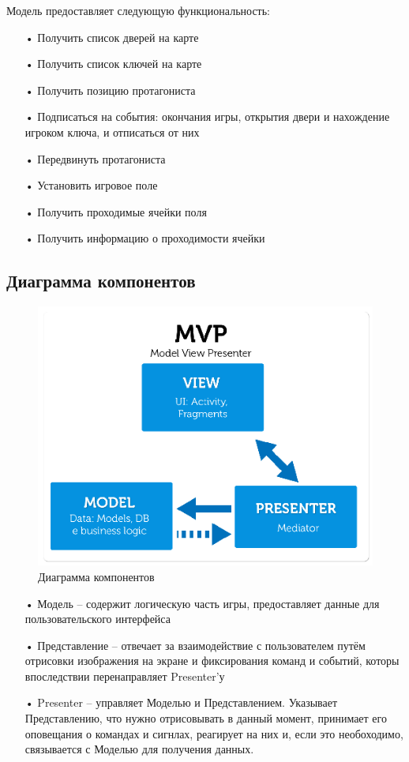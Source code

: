 Модель предоставляет следующую функциональность:

\begin{enumerate}  
\item[•]  Получить список дверей на карте
\item[•]  Получить список ключей на карте
\item[•]  Получить позицию протагониста
\item[•]  Подписаться на события: окончания игры, открытия двери и нахождение игроком ключа, и отписаться от них
\item[•]  Передвинуть протагониста
\item[•]  Установить игровое поле
\item[•]  Получить проходимые ячейки поля
\item[•]  Получить информацию о проходимости ячейки
\end{enumerate}


\subsection{Диаграмма компонентов}

\begin{figure}[H]
	\begin{center}
		\includegraphics[scale=0.7]{pics/MVP-Process.png}
		\caption{Диаграмма компонентов} 
		\label{pic:pic_name} %
	\end{center}
\end{figure}

\begin{enumerate}
\item[•] Модель -- содержит логическую часть игры, предоставляет данные для пользовательского интерфейса
\item[•] Представление -- отвечает за взаимодействие с пользователем путём отрисовки изображения на экране и фиксирования команд и событий, которы впоследствии перенаправляет Presenter'у
\item[•] Presenter -- управляет Моделью и Представлением. Указывает Представлению, что нужно отрисовывать в данный момент, принимает его оповещания о командах и сигнлах, реагирует на них и, если это необоходимо, связывается с Моделью для получения данных. 
\end{enumerate}

